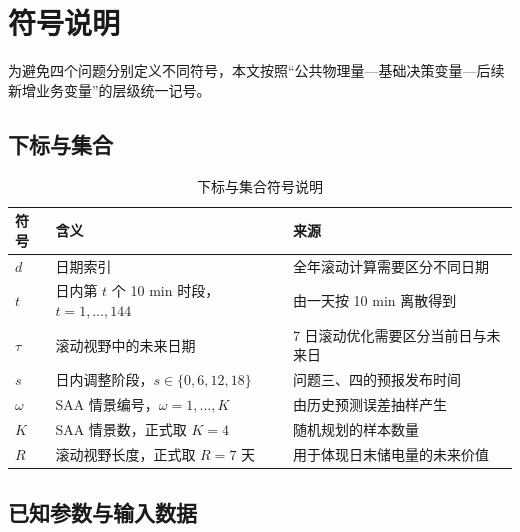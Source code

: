 \section{符号说明}
为避免四个问题分别定义不同符号，本文按照“公共物理量—基础决策变量—后续新增业务变量”的层级统一记号。

\subsection{下标与集合}

\begin{table}[H]
\centering
{}
\begin{tabular}{lll}
\toprule
符号 & 含义 & 来源 \\
\midrule
\(d\) & 日期索引 & 全年滚动计算需要区分不同日期 \\
\(t\) & 日内第 \(t\) 个 10 min 时段，\(t=1,\ldots,144\) & 由一天按 10 min 离散得到 \\
\(\tau\) & 滚动视野中的未来日期 & 7 日滚动优化需要区分当前日与未来日 \\
\(s\) & 日内调整阶段，\(s\in\{0,6,12,18\}\) & 问题三、四的预报发布时间 \\
\(\omega\) & SAA 情景编号，\(\omega=1,\ldots,K\) & 由历史预测误差抽样产生 \\
\(K\) & SAA 情景数，正式取 \(K=4\) & 随机规划的样本数量 \\
\(R\) & 滚动视野长度，正式取 \(R=7\) 天 & 用于体现日末储电量的未来价值 \\
\bottomrule
\end{tabular}
\caption{下标与集合符号说明}
\label{tab:1}
\end{table}

\subsection{已知参数与输入数据}

